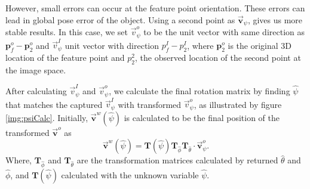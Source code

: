 \documentclass[annual]{acmsiggraph}
\begin{document}
However, small errors can occur at the feature point orientation. These errors can lead in global pose error of the object. Using a second point as $\vec{\mathbf{v}}_{\psi}$, gives us more stable results. In this case, we set $\vec{v}_{\psi}^o$ to be the unit vector with same direction as $\mathbf{p}_{f}^o - \mathbf{p}_{2}^o$ and $\vec{v}_{\psi}^I$ unit vector with direction $p_{f}^I - p^I_{2}$, where $\mathbf{p}_{2}^o$ is the original 3D location of the feature point and $p_{2}^2$, the observed location of the second point at the image space. 

After calculating $\vec{v}_{\psi}^I$ and $\vec{v}_{\psi}^o$, we calculate the final rotation matrix by finding $\hat{\psi}$ that matches the captured $\vec{v}_{\psi}^I$ with transformed $\vec{v}_{\psi}^o$, as illustrated by figure \ref{img:psiCalc}. Initially, $\vec{\mathbf{v}}^w(\hat{\psi})$ is calculated to be the final position of the transformed $\vec{\mathbf{v}}^o$ as
\begin{equation}
\vec{\mathbf{v}}^w(\hat{\psi}) = \mathbf{T}(\hat{\psi})\mathbf{T}_{\hat{\phi}}\mathbf{T}_{\hat{\theta}}\cdot \vec{\mathbf{v}}_{\psi}^o. 
\end{equation}
Where, $\mathbf{T}_{\hat{\phi}}$ and $\mathbf{T}_{\hat{\theta}}$ are the transformation matrices calculated by returned $\hat{\theta}$ and $\hat{\phi}$, and $\mathbf{T}(\hat{\psi})$ calculated with the unknown variable $\hat{\psi}$.
 
\end{document}

